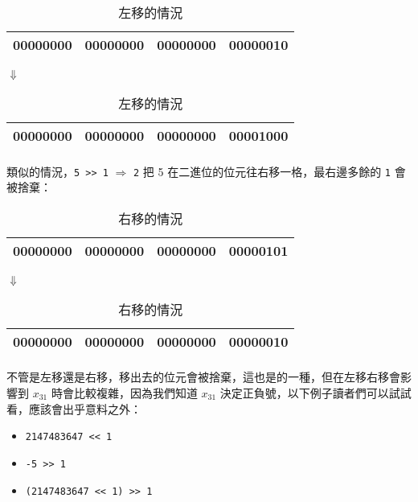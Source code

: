 \documentclass[12pt,a4paper,oneside]{article}
\begin{document}
\begin{CJK}{UTF8}{bkai}
\begin{table}[h!]
\centering
\begin{tabular}{|c|c|c|c|}
\hline
00000000 & 00000000 & 00000000 & 000000{\color{red}10}\\
\hline
\end{tabular}
\begin{center}$\Downarrow$\end{center}
\begin{tabular}{|c|c|c|c|}
\hline
00000000 & 00000000 & 00000000 & 0000{\color{red}10}00\\
\hline
\end{tabular}
\caption{左移的情況}
\label{basic:cpp:table:left:shift}
\end{table}

\paragraph{}類似的情況，\lstinline!5 >> 1!{ $\Rightarrow$ \lstinline!2!} 把 5 在二進位的位元往右移一格，最右邊多餘的 \lstinline!1! 會被捨棄：

\begin{table}[h!]
\centering
\begin{tabular}{|c|c|c|c|}
\hline
00000000 & 00000000 & 00000000 & 00000{\color{red}101}\\
\hline
\end{tabular}
\begin{center}$\Downarrow$\end{center}
\begin{tabular}{|c|c|c|c|}
\hline
00000000 & 00000000 & 00000000 & 000000{\color{red}10}\\
\hline
\end{tabular}
\caption{右移的情況}
\label{basic:cpp:table:right:shift}
\end{table}

\paragraph{}不管是左移還是右移，移出去的位元會被捨棄，這也是的一種，但在左移右移會影響到 $x_{31}$ 時會比較複雜，因為我們知道 $x_{31}$ 決定正負號，以下例子讀者們可以試試看，應該會出乎意料之外：
\begin{itemize}
\item \lstinline!2147483647 << 1!
\item \lstinline!-5 >> 1!
\item \lstinline!(2147483647 << 1) >> 1!
\end{itemize}


\end{CJK}
\end{document}
